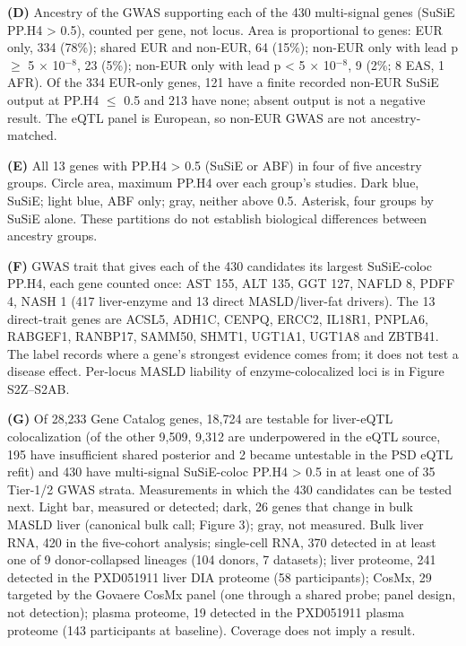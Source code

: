 \textbf{(D)} Ancestry of the GWAS supporting each of the 430 multi-signal genes (SuSiE PP.H4 \textgreater{} 0.5), counted per gene, not locus. Area is proportional to genes: EUR only, 334 (78\%); shared EUR and non-EUR, 64 (15\%); non-EUR only with lead p $\ge$ 5 $\times$ 10$^{-8}$, 23 (5\%); non-EUR only with lead p \textless{} 5 $\times$ 10$^{-8}$, 9 (2\%; 8 EAS, 1 AFR). Of the 334 EUR-only genes, 121 have a finite recorded non-EUR SuSiE output at PP.H4 $\le$ 0.5 and 213 have none; absent output is not a negative result. The eQTL panel is European, so non-EUR GWAS are not ancestry-matched.

\textbf{(E)} All 13 genes with PP.H4 \textgreater{} 0.5 (SuSiE or ABF) in four of five ancestry groups. Circle area, maximum PP.H4 over each group's studies. Dark blue, SuSiE; light blue, ABF only; gray, neither above 0.5. Asterisk, four groups by SuSiE alone. These partitions do not establish biological differences between ancestry groups.

\textbf{(F)} GWAS trait that gives each of the 430 candidates its largest SuSiE-coloc PP.H4, each gene counted once: AST 155, ALT 135, GGT 127, NAFLD 8, PDFF 4, NASH 1 (417 liver-enzyme and 13 direct MASLD/liver-fat drivers). The 13 direct-trait genes are ACSL5, ADH1C, CENPQ, ERCC2, IL18R1, PNPLA6, RABGEF1, RANBP17, SAMM50, SHMT1, UGT1A1, UGT1A8 and ZBTB41. The label records where a gene's strongest evidence comes from; it does not test a disease effect. Per-locus MASLD liability of enzyme-colocalized loci is in Figure S2Z--S2AB.

\textbf{(G)} Of 28,233 Gene Catalog genes, 18,724 are testable for liver-eQTL colocalization (of the other 9,509, 9,312 are underpowered in the eQTL source, 195 have insufficient shared posterior and 2 became untestable in the PSD eQTL refit) and 430 have multi-signal SuSiE-coloc PP.H4 \textgreater{} 0.5 in at least one of 35 Tier-1/2 GWAS strata. Measurements in which the 430 candidates can be tested next. Light bar, measured or detected; dark, 26 genes that change in bulk MASLD liver (canonical bulk call; Figure 3); gray, not measured. Bulk liver RNA, 420 in the five-cohort analysis; single-cell RNA, 370 detected in at least one of 9 donor-collapsed lineages (104 donors, 7 datasets); liver proteome, 241 detected in the PXD051911 liver DIA proteome (58 participants); CosMx, 29 targeted by the Govaere CosMx panel (one through a shared probe; panel design, not detection); plasma proteome, 19 detected in the PXD051911 plasma proteome (143 participants at baseline). Coverage does not imply a result.
